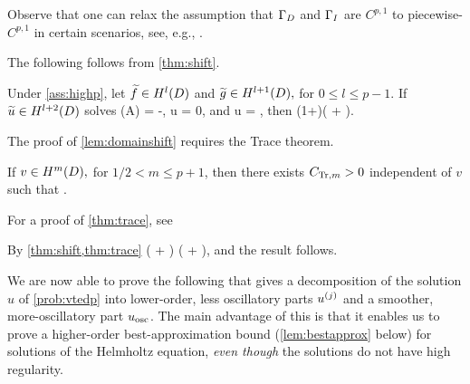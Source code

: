 Observe that one can relax the assumption that $\Gamma_{D}$ and $\Gamma_{I}$ are $C^{p,1}$ to piecewise-$C^{p,1}$ in certain scenarios, see, e.g., \cite[Section 2.1]{ChNi:19}.
\ere




The following  follows from \cref{thm:shift}.

\bco\label{lem:domainshift}
Under \cref{ass:highp}, let $\ftilde \in \HlD$ and $\gtilde \in \HlpoD,$ for $0 \leq l \leq p-1$. If $\utilde \in \HlptD$ solves
\beqs
\grad \cdot \mleft(A\grad \utilde\mright) = -\ftilde,
\eeqs
\beqs \trGD u = 0,
\eeqs
and
\beqs
\dn u = \trGI \gtilde,
\eeqs
then
\beqs
\NHlptD{\utilde} \leq \CAl\mleft(1+\CTrlpo\mright)\mleft(\NHlD{\ftilde} + \NHlpoD{\trGI \gtilde}\mright).
\eeqs
\eco

The proof of \cref{lem:domainshift} requires the Trace theorem.

\label{thm:trace}
If $v \in \HmD,$ for $1/2 < m \leq p+1$, then there exists $C_{\mathrm{Tr},m} > 0$ independent of $v$ such that
\beqs
{} \leq \CTrm {}.
\eeqs
\enth

For a proof of \cref{thm:trace}, see \cite[Theorem 3.37]{Mc:00}

By \cref{thm:shift,thm:trace}
\beqs
\NHlptD{\utilde} \leq \CAl \mleft(\NHlD{\ftilde} + \NHlphGI{\gtilde}\mright) \leq \CAl \mleft(\NHlD{\ftilde} + \NHlpoD{\gtilde}\mright),
\eeqs
and the result follows.
\epf

We are now able to prove the following  that gives a decomposition of the solution $u$ of \cref{prob:vtedp} into lower-order, less oscillatory parts $u^{(j)}$ and a smoother, more-oscillatory part $u_{\mathrm{osc}}$. The main advantage of this  is that it enables us to prove a higher-order best-approximation bound (\cref{lem:bestapprox} below) for solutions of the Helmholtz equation, \emph{even though} the solutions do not have high regularity.

